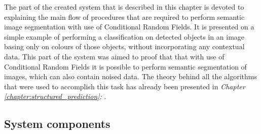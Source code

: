 The part of the created system that is described in this chapter is devoted to explaining the main flow of procedures that are required to perform semantic image segmentation with use of Conditional Random Fields. It is presented on a simple example of performing a classification on detected objects in an image basing only on colours of those objects, without incorporating any contextual data. This part of the system was aimed to proof that that with use of Conditional Random Fields it is possible to perform semantic  segmentation of images, which can also contain noised data. The theory behind all the algorithms that were used to accomplish this task has already been presented in \textit{Chapter \ref{chapter:structured_prediction}: }.

\subsection{System components}

